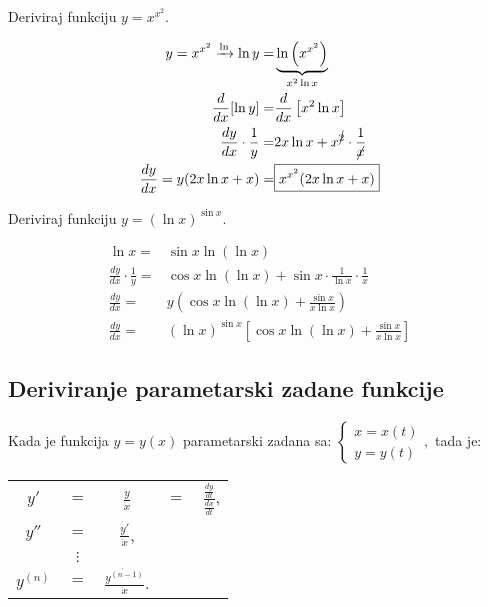 \begin{multicols}{2}
\begin{example}
    Deriviraj funkciju $y=x^{x^2}$.
\end{example}

\begin{align*}
    y=x^{x^2} \xrightarrow{\ln} \ln y=& \underbrace{\ln \left(x^{x^2}\right)}_{x^2 \ln x}\\
    \frac{d}{dx}[\ln y] =& \frac{d}{dx} \left[ x^2 \ln x \right]\\
    \frac{dy}{dx}\cdot\frac{1}{y}=& 2x \ln x + x^{\cancel{2}}\cdot\frac{1}{\cancel{x}}\\
    \frac{dy}{dx} = y (2x\ln x + x) =& \boxed{x^{x^2} (2x\ln x + x)}
\end{align*}

\columnbreak

\begin{example}
    Deriviraj funkciju $y=(\ln x)^{\sin x}$.
\end{example}

\begin{align*}
    \ln x = &\sin x \ln (\ln x)\\
    \frac{dy}{dx}\cdot\frac{1}{y} =& \cos x \ln (\ln x) + \sin x \cdot \frac{1}{\ln x} \cdot \frac{1}{x}\\
    \frac{dy}{dx} =& y (\cos x \ln (\ln x) + \frac{\sin x}{x \ln x})\\
    \frac{dy}{dx} =& \boxed{(\ln x)^{\sin x}\left[\cos x \ln (\ln x) + \frac{\sin x}{x \ln x}\right]}
\end{align*}

\end{multicols}


\subsection{Deriviranje parametarski zadane funkcije}

Kada je funkcija $y=y(x)$ parametarski zadana sa: $\displaystyle
\begin{cases}
    x = x(t)\\
    y = y(t)
\end{cases},
$ tada je:

\begin{center}
    \begin{tabular}{ccccc}
    $y'$&$=$&$\displaystyle\frac{\dot{y}}{\dot{x}}$&$=$&$\displaystyle\frac{\frac{dy}{dt}}{\frac{dx}{dt}}$,\\
    $y''$&$=$&$\displaystyle\frac{\dot{y'}}{\dot{x}}$,\\
    &$\vdots$&\\
    $y^{(n)}$&$=$&$\displaystyle\frac{\dot{y^{(n-1)}}}{\dot{x}}$.
    \end{tabular}
\end{center}

